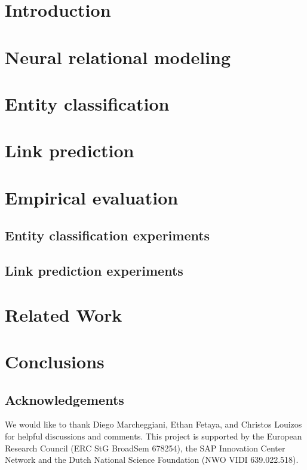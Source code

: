 \documentclass[letterpaper]{article} %
\begin{document}
\section{Introduction}


\section{Neural relational modeling}


\section{Entity classification}


\section{Link prediction}\label{section:link_prediction}


\section{Empirical evaluation}

\subsection{Entity classification experiments}\label{sec:ent_exp}


\subsection{Link prediction experiments}


\section{Related Work}


\section{Conclusions}


\subsection*{Acknowledgements}
We would like to thank Diego Marcheggiani, Ethan Fetaya, and Christos Louizos for helpful discussions and comments.
This project is supported by the European Research Council (ERC StG BroadSem 678254), the SAP Innovation
Center Network
and the Dutch National Science Foundation (NWO VIDI 639.022.518).




\newpage
\onecolumn
\setlength{\parskip}{0.5em}
\appendix

\end{document}
